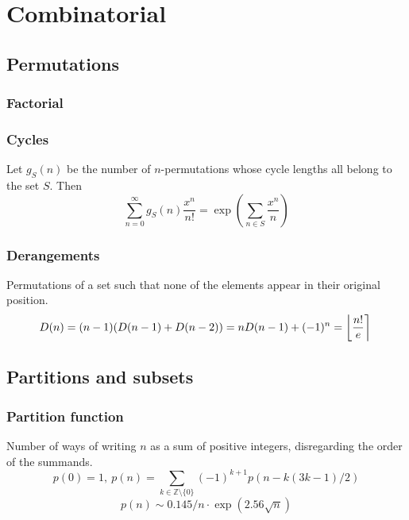 \chapter{Combinatorial}

\section{Permutations}
	\subsection{Factorial}

	\subsection{Cycles}
		Let $g_S(n)$ be the number of $n$-permutations whose cycle lengths all belong to the set $S$. Then
		$$\sum_{n=0} ^\infty g_S(n) \frac{x^n}{n!} = \exp\left(\sum_{n\in S} \frac{x^n} {n} \right)$$

	\subsection{Derangements}
		Permutations of a set such that none of the elements appear in their original position.
		\[ \mkern-2mu D(n) = (n-1)(D(n-1)+D(n-2)) = n D(n-1)+(-1)^n = \left\lfloor\frac{n!}{e}\right\rceil \]



\section{Partitions and subsets}
	\subsection{Partition function}
		Number of ways of writing $n$ as a sum of positive integers, disregarding the order of the summands.
		\[ p(0) = 1,\ p(n) = \sum_{k \in \mathbb Z \setminus \{0\}}{(-1)^{k+1} p(n - k(3k-1) / 2)} \]
		\[ p(n) \sim 0.145 / n \cdot \exp(2.56 \sqrt{n}) \]

